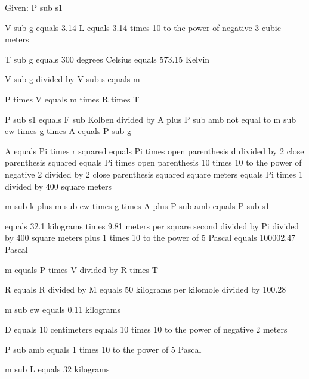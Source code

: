 Given: P sub s1

V sub g equals 3.14 L equals 3.14 times 10 to the power of negative 3 cubic meters

T sub g equals 300 degrees Celsius equals 573.15 Kelvin

V sub g divided by V sub s equals m

P times V equals m times R times T

P sub s1 equals F sub Kolben divided by A plus P sub amb not equal to m sub ew times g times A equals P sub g

A equals Pi times r squared equals Pi times open parenthesis d divided by 2 close parenthesis squared equals Pi times open parenthesis 10 times 10 to the power of negative 2 divided by 2 close parenthesis squared square meters equals Pi times 1 divided by 400 square meters

m sub k plus m sub ew times g times A plus P sub amb equals P sub s1

equals 32.1 kilograms times 9.81 meters per square second divided by Pi divided by 400 square meters plus 1 times 10 to the power of 5 Pascal equals 100002.47 Pascal

m equals P times V divided by R times T

R equals R divided by M equals 50 kilograms per kilomole divided by 100.28

m sub ew equals 0.11 kilograms

D equals 10 centimeters equals 10 times 10 to the power of negative 2 meters

P sub amb equals 1 times 10 to the power of 5 Pascal

m sub L equals 32 kilograms